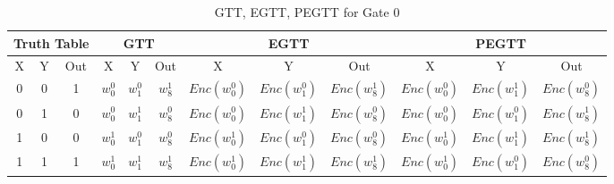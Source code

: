 \documentclass[times]{article}
\begin{document}
	\begin{table}
		\centering
		\caption{GTT, EGTT, PEGTT for Gate 0}
		\label{tab:gtt0}
		\begin{adjustbox}{width=1\textwidth}
		\begin{tabular}{|c|c|c||c|c|c||c|c|c||c|c|c|}
			\hline
			\multicolumn{3}{|c||}{Truth Table} 		& 
				\multicolumn{3}{|c||}{GTT}			& 
					\multicolumn{3}{|c||}{EGTT} 		& 
						\multicolumn{3}{|c|}{PEGTT} \\
			\hline
			\hline
			X & Y & Out	& 
				X & Y & Out	& 
					X & Y & Out	& 
						X & Y & Out	\\
			\hline
			0 & 0 & 1 	&
				$w_{0}^0$	& $w_{1}^0$	& $w_{8}^1$	& 
					$Enc(w_{0}^0)$	& $Enc(w_{1}^0)$	& $Enc(w_{8}^1)$ &
						$Enc(w_{0}^0)$	& $Enc(w_{1}^1)$	& $Enc(w_{8}^0)$ \\
			\hline
			0 & 1 & 0 	&
				$w_{0}^0$	& $w_{1}^1$	& $w_{8}^0$	& 
					$Enc(w_{0}^0)$	& $Enc(w_{1}^1)$	& $Enc(w_{8}^0)$ &
						$Enc(w_{0}^0)$	& $Enc(w_{1}^0)$	& $Enc(w_{8}^1)$ \\
			\hline
			1 & 0 & 0 	&
				$w_{0}^1$	& $w_{1}^0$	& $w_{8}^0$	& 
					$Enc(w_{0}^1)$	& $Enc(w_{1}^0)$	& $Enc(w_{8}^0)$ &
						$Enc(w_{0}^1)$	& $Enc(w_{1}^1)$	& $Enc(w_{8}^1)$ \\
			\hline
			1 & 1 & 1 	&
				$w_{0}^1$	& $w_{1}^1$	& $w_{8}^1$	& 
					$Enc(w_{0}^1)$	& $Enc(w_{1}^1)$	& $Enc(w_{8}^1)$ &
						$Enc(w_{0}^1)$	& $Enc(w_{1}^0)$	& $Enc(w_{8}^0)$ \\
			\hline
		\end{tabular}
		\end{adjustbox}
	\end{table}
\end{document}
